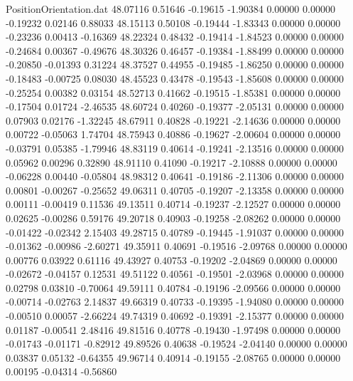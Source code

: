 \begin{filecontents}{PositionOrientation.dat}
  48.07116    0.51646   -0.19615    -1.90384    0.00000    0.00000   -0.19232    0.02146    0.88033
  48.15113    0.50108   -0.19444    -1.83343    0.00000    0.00000   -0.23236    0.00413   -0.16369
  48.22324    0.48432   -0.19414    -1.84523    0.00000    0.00000   -0.24684    0.00367   -0.49676
  48.30326    0.46457   -0.19384    -1.88499    0.00000    0.00000   -0.20850   -0.01393    0.31224
  48.37527    0.44955   -0.19485    -1.86250    0.00000    0.00000   -0.18483   -0.00725    0.08030
  48.45523    0.43478   -0.19543    -1.85608    0.00000    0.00000   -0.25254    0.00382    0.03154
  48.52713    0.41662   -0.19515    -1.85381    0.00000    0.00000   -0.17504    0.01724   -2.46535
  48.60724    0.40260   -0.19377    -2.05131    0.00000    0.00000    0.07903    0.02176   -1.32245
  48.67911    0.40828   -0.19221    -2.14636    0.00000    0.00000    0.00722   -0.05063    1.74704
  48.75943    0.40886   -0.19627    -2.00604    0.00000    0.00000   -0.03791    0.05385   -1.79946
  48.83119    0.40614   -0.19241    -2.13516    0.00000    0.00000    0.05962    0.00296    0.32890
  48.91110    0.41090   -0.19217    -2.10888    0.00000    0.00000   -0.06228    0.00440   -0.05804
  48.98312    0.40641   -0.19186    -2.11306    0.00000    0.00000    0.00801   -0.00267   -0.25652
  49.06311    0.40705   -0.19207    -2.13358    0.00000    0.00000    0.00111   -0.00419    0.11536
  49.13511    0.40714   -0.19237    -2.12527    0.00000    0.00000    0.02625   -0.00286    0.59176
  49.20718    0.40903   -0.19258    -2.08262    0.00000    0.00000   -0.01422   -0.02342    2.15403
  49.28715    0.40789   -0.19445    -1.91037    0.00000    0.00000   -0.01362   -0.00986   -2.60271
  49.35911    0.40691   -0.19516    -2.09768    0.00000    0.00000    0.00776    0.03922    0.61116
  49.43927    0.40753   -0.19202    -2.04869    0.00000    0.00000   -0.02672   -0.04157    0.12531
  49.51122    0.40561   -0.19501    -2.03968    0.00000    0.00000    0.02798    0.03810   -0.70064
  49.59111    0.40784   -0.19196    -2.09566    0.00000    0.00000   -0.00714   -0.02763    2.14837
  49.66319    0.40733   -0.19395    -1.94080    0.00000    0.00000   -0.00510    0.00057   -2.66224
  49.74319    0.40692   -0.19391    -2.15377    0.00000    0.00000    0.01187   -0.00541    2.48416
  49.81516    0.40778   -0.19430    -1.97498    0.00000    0.00000   -0.01743   -0.01171   -0.82912
  49.89526    0.40638   -0.19524    -2.04140    0.00000    0.00000    0.03837    0.05132   -0.64355
  49.96714    0.40914   -0.19155    -2.08765    0.00000    0.00000    0.00195   -0.04314   -0.56860

\end{filecontents}
